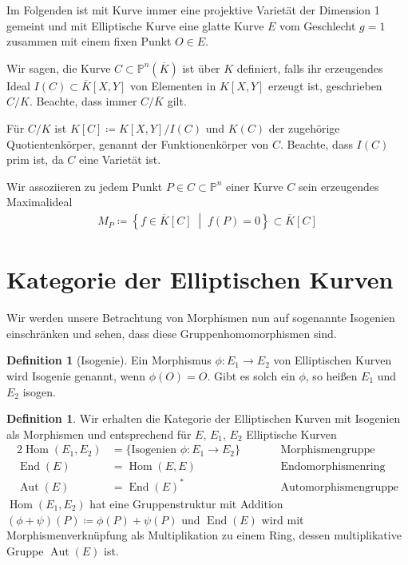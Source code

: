 \documentclass[english, german, parskip=half]{scrartcl}
\theoremstyle{definition}
\newtheorem{Definition}[Satz]{Definition}
\theoremstyle{remark}
\newcommand*{\K}{\ensuremath{K}} %
\newcommand*{\algK}{\ensuremath{\overline K}} %
\renewcommand*{\P}{\ensuremath{\mathds{P}}} %
\DeclareMathOperator{\Hom}{Hom} %
\DeclareMathOperator{\End}{End} %
\DeclareMathOperator{\Aut}{Aut} %
\begin{document}
Im Folgenden ist mit Kurve immer eine projektive Varietät der
Dimension 1 gemeint und mit Elliptische Kurve eine glatte Kurve $E$ vom
Geschlecht $g=1$ zusammen mit einem fixen Punkt $O\in E$.

Wir sagen, die Kurve $C\subset\P^n(\algK)$ ist über $\K$ definiert,
falls ihr erzeugendes Ideal $I(C)\subset\algK[X,Y]$ von
Elementen in $\K[X,Y]$ erzeugt ist, geschrieben $C/\K$. Beachte, dass
immer $C/\algK$ gilt. 

Für $C/\K$ ist $\K[C]\coloneqq\K[X,Y]/I(C)$ 
und $\K(C)$ der zugehörige Quotientenkörper, genannt
der Funktionenkörper von $C$.
Beachte, dass $I(C)$ prim ist, da $C$ eine Varietät ist.

Wir assoziieren zu jedem Punkt $P\in C\subset\P^n$ einer Kurve $C$
sein erzeugendes Maximalideal 
\begin{gather*}
  M_P\coloneqq\left\{f\in\algK[C]\;\middle\vert\;f(P)=0\right\}
  \subset \algK[C]
\end{gather*}




\section{Kategorie der Elliptischen Kurven}
Wir werden unsere Betrachtung von Morphismen nun auf sogenannte
Isogenien einschränken und sehen, dass diese Gruppenhomomorphismen
sind.

\begin{Definition}[Isogenie]
  Ein Morphismus $\phi\colon E_1\to E_2$ von Elliptischen Kurven wird
  Isogenie genannt, wenn $\phi(O)=O$.
  Gibt es solch ein $\phi$, so heißen $E_1$ und $E_2$ isogen.
\end{Definition}

\begin{Definition}
  Wir erhalten die Kategorie der Elliptischen Kurven mit Isogenien als
  Morphismen und entsprechend für $E$, $E_1$, $E_2$ Elliptische Kurven
  \begin{alignat*}{2}
    \Hom(E_1, E_2)&=\{\text{Isogenien }\phi\colon E_1\to E_2\}
    \qquad&&\text{Morphismengruppe}
    \\
    \End(E)&=\Hom(E,E)
    &&\text{Endomorphismenring}\\
    \Aut(E)&=\End(E)^*
    &&\text{Automorphismengruppe} 
  \end{alignat*}
  $\Hom(E_1, E_2)$ hat eine Gruppenstruktur mit Addition
  $(\phi+\psi)(P)\coloneqq \phi(P)+\psi(P)$ 
  und $\End(E)$ wird mit Morphismenverknüpfung als Multiplikation zu 
  einem Ring, dessen multiplikative Gruppe $\Aut(E)$ ist.
\end{Definition}
\end{document}
